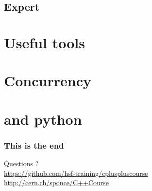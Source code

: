 \documentclass[compress]{beamer}
\begin{document}

\begin{advanced}
  
  
\end{advanced}



\begin{advanced}
  
  
  
\end{advanced}

\begin{advanced}
  
\end{advanced}

\begin{advanced}
  \section[exp]{Expert \cpp}
  
  
  
  
  
  
  
\end{advanced}

\section[Tool]{Useful tools}






\begin{advanced}
  
  
  
  
  

  \section[conc]{Concurrency}
  
  
  
  

  \section[py]{\cpp and python}
  
  
  
  
\end{advanced}

\begin{frame}
  \frametitle{This is the end}
  \begin{center}
    \Huge Questions ?\\
    \vspace{.5cm}
    \tiny \href{https://github.com/hsf-training/cpluspluscourse}{https://github.com/hsf-training/cpluspluscourse}\\
    \tiny \href{http://cern.ch/sponce/C++Course}{http://cern.ch/sponce/C++Course}
  \end{center}
\end{frame}
\end{document}
